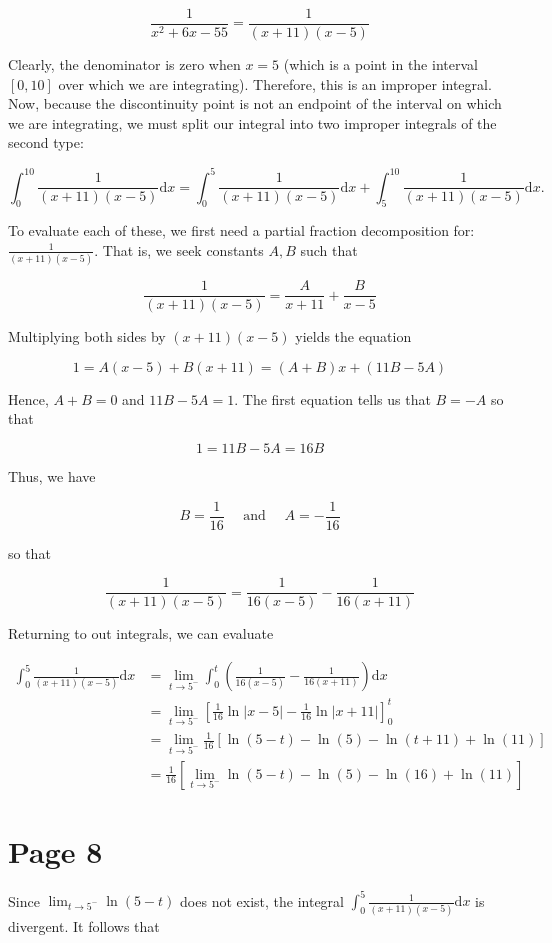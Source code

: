 \documentclass[10pt]{article}
\begin{document}
$$
\frac{1}{x^{2}+6 x-55}=\frac{1}{(x+11)(x-5)}
$$

Clearly, the denominator is zero when $x=5$ (which is a point in the interval $[0,10]$ over which we are integrating). Therefore, this is an improper integral. Now, because the discontinuity point is not an endpoint of the interval on which we are integrating, we must split our integral into two improper integrals of the second type:

$$
\int_{0}^{10} \frac{1}{(x+11)(x-5)} \mathrm{d} x=\int_{0}^{5} \frac{1}{(x+11)(x-5)} \mathrm{d} x+\int_{5}^{10} \frac{1}{(x+11)(x-5)} \mathrm{d} x .
$$

To evaluate each of these, we first need a partial fraction decomposition for: $\frac{1}{(x+11)(x-5)}$. That is, we seek constants $A, B$ such that

$$
\frac{1}{(x+11)(x-5)}=\frac{A}{x+11}+\frac{B}{x-5}
$$

Multiplying both sides by $(x+11)(x-5)$ yields the equation

$$
1=A(x-5)+B(x+11)=(A+B) x+(11 B-5 A)
$$

Hence, $A+B=0$ and $11 B-5 A=1$. The first equation tells us that $B=-A$ so that

$$
1=11 B-5 A=16 B
$$

Thus, we have

$$
B=\frac{1}{16} \quad \text { and } \quad A=-\frac{1}{16}
$$

so that

$$
\frac{1}{(x+11)(x-5)}=\frac{1}{16(x-5)}-\frac{1}{16(x+11)}
$$

Returning to out integrals, we can evaluate

$$
\begin{aligned}
\int_{0}^{5} \frac{1}{(x+11)(x-5)} \mathrm{d} x & =\lim _{t \rightarrow 5^{-}} \int_{0}^{t}\left(\frac{1}{16(x-5)}-\frac{1}{16(x+11)}\right) \mathrm{d} x \\
& =\lim _{t \rightarrow 5^{-}}\left[\frac{1}{16} \ln |x-5|-\frac{1}{16} \ln |x+11|\right]_{0}^{t} \\
& =\lim _{t \rightarrow 5^{-}} \frac{1}{16}[\ln (5-t)-\ln (5)-\ln (t+11)+\ln (11)] \\
& =\frac{1}{16}\left[\lim _{t \rightarrow 5^{-}} \ln (5-t)-\ln (5)-\ln (16)+\ln (11)\right]
\end{aligned}
$$

\section*{Page 8}
Since $\lim _{t \rightarrow 5^{-}} \ln (5-t)$ does not exist, the integral $\int_{0}^{5} \frac{1}{(x+11)(x-5)} \mathrm{d} x$ is divergent. It follows that
\end{document}
